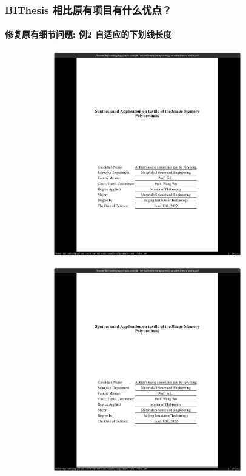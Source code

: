 \documentclass[
  aspectratio=169,
  presentation,
  titlegraphic=./images/bit.png,
  framelogo=./images/bit.png
]{bitbeamer}
\begin{document}
\begin{frame}[t]
  \frametitle{BIThesis 相比原有项目有什么优点？}
  \framesubtitle{修复原有细节问题: 例2 自适应的下划线长度}

  \vspace{-0.8cm}

  \begin{figure}
    \begin{subfigure}{0.45\textwidth}
      \includegraphics[width=0.9\textwidth]{images/6-1.png}
    \end{subfigure}
    \begin{subfigure}{0.45\textwidth}
      \includegraphics[width=0.9\textwidth]{images/6-2.png}
    \end{subfigure}
  \end{figure}
\end{frame}
\end{document}
